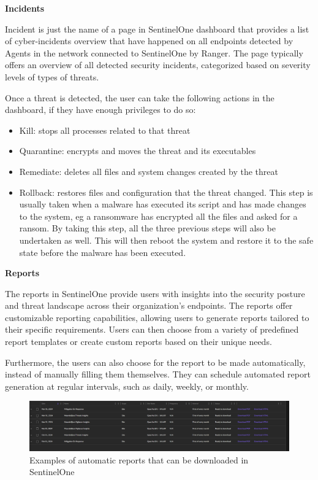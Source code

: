 \textbf{Incidents}

Incident is just the name of a page in SentinelOne dashboard that provides a list of cyber-incidents overview that have happened on all
endpoints detected by Agents in the network connected to SentinelOne by Ranger. The page typically offers an overview of all detected
security incidents, categorized based on severity levels of types of threats.

Once a threat is detected, the user can take the following actions in the dashboard, if they have enough privileges
to do so:
\begin{itemize}
      \item Kill: stops all processes related to that threat
      \item Quarantine: encrypts and moves the threat and its executables
      \item Remediate: deletes all files and system changes created by the threat
      \item Rollback: restores files and configuration that the threat changed. This step is usually taken when a malware has
            executed its script and has made changes to the system, \acrshort{eg} a ransomware has encrypted all the files and
            asked for a ransom. By taking this step, all the three previous steps will also be undertaken as well. This will
            then reboot the system and restore it to the safe state before the malware has been executed.
\end{itemize}

\textbf{Reports}

The reports in SentinelOne provide users with insights into the security posture and threat landscape across their organization's
endpoints. The reports offer customizable reporting capabilities, allowing users to generate reports tailored to their specific
requirements. Users can then choose from a variety of predefined report templates or create custom reports based on their unique
needs.

Furthermore, the users can also choose for the report to be made automatically, instead of manually filling them themselves. They can
schedule automated report generation at regular intervals, such as daily, weekly, or monthly.

\begin{figure}[htbp]
      \centering
      \includegraphics[width=1.0\textwidth]{Figures/SentinelOne/Reports.png}
      \caption{Examples of automatic reports that can be downloaded in SentinelOne}
      \label{fig:Reports}
\end{figure}

